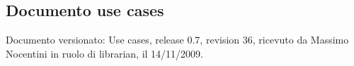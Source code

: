 \subsection{Documento use cases}
Documento versionato: Use cases, release 0.7, revision 36, ricevuto da
Massimo Nocentini in ruolo di librarian, il 14/11/2009.